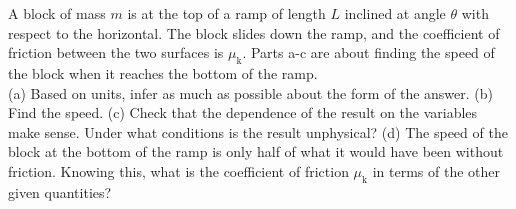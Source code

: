 A block of mass $m$ is at the top of a ramp of length $L$ inclined at
angle $\theta$ with respect to the horizontal. The block slides down
the ramp, and the coefficient of friction between the two surfaces is
$\mu_\text{k}$. Parts a-c are about finding the speed of the block when it reaches the bottom of the
ramp.\\
%
(a) Based on units, infer as much as possible about the form of the answer.\hwendpart
%
(b) Find the speed.\answercheck\hwendpart
%
(c) Check that the dependence of the result on the variables make sense. Under what conditions
is the result unphysical?\hwendpart
%
(d) The speed of the block at the bottom of the ramp is only half of
what it would have been without friction. Knowing this, what is the
coefficient of friction $\mu_\text{k}$ in terms of the other given
quantities?\answercheck
